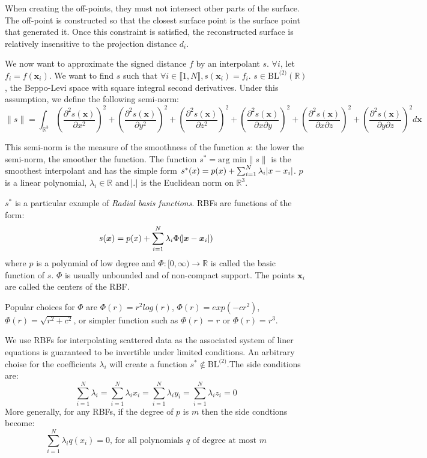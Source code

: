 \documentclass[12pt]{article}
\begin{document}
When creating the off-points, they must not intersect other parts of the surface. The off-point is constructed so that the closest surface point is the surface point that generated it. Once this constraint is satisfied, the reconstructed surface is relatively insensitive to the projection distance $d_i$.

We now want to approximate the signed distance $f$ by an interpolant $s$. $\forall i$, let $f_i = f(\boldsymbol{x}_i)$. We want to find $s$ such that $\forall i\in\llbracket 1,N\rrbracket, s(\boldsymbol{x}_i) = f_i$. $s \in \text{BL}^{\text{(2)}}(\mathbb{R})$, the Beppo-Levi space with square integral second derivatives. Under this assumption, we define the following semi-norm:
$$\|s\| = \int_{\mathbb{R}^3}\left(\frac{\partial^2s(\boldsymbol{x})}{\partial x^2}\right)^2 + \left(\frac{\partial^2s(\boldsymbol{x})}{\partial y^2}\right)^2 + \left(\frac{\partial^2s(\boldsymbol{x})}{\partial z^2}\right)^2 + \left(\frac{\partial^2s(\boldsymbol{x})}{\partial x\partial y}\right)^2 + \left(\frac{\partial^2s(\boldsymbol{x})}{\partial x\partial z}\right)^2 + \left(\frac{\partial^2s(\boldsymbol{x})}{\partial y\partial z}\right)^2 d\boldsymbol{x}$$

This semi-norm is the measure of the smoothness of the function $s$: the lower the semi-norm, the smoother the function. The function $s^* = \text{arg min} \|s\|$ is the smoothest interpolant and has the simple form $s^*(x) = p(x) + \sum_{i = 1}^{N}\lambda_i\abs{x - x_i}$. $p$ is a linear polynomial, $\lambda_i \in \mathbb{R}$ and $\abs{.}$ is the Euclidean norm on $\mathbb{R}^3$.

$s^*$ is a particular example of \emph{Radial basis functions}. RBFs are functions of the form:
$$s(\boldsymbol{x}) = p(x) + \sum_{i=1}^{N}\lambda_i\Phi(\abs{\boldsymbol{x} - \boldsymbol{x}_i})$$
where $p$ is a polynmial of low degree and $\Phi:[0,\infty) \to \mathbb{R}$ is called the basic function of $s$. $\Phi$ is usually unbounded and of non-compact support. The points $\boldsymbol{x}_i$ are called the centers of the RBF.

Popular choices for $\Phi$ are $\Phi(r) = r^2log(r)$, $\Phi(r) = exp(-cr^2)$, $\Phi(r) = \sqrt{r^2+c^2}$, or simpler function such as $\Phi(r) = r$ or $\Phi(r) = r^3$.

We use RBFs for interpolating scattered data as the associated system of liner equations is guaranteed to be invertible under limited conditions. An arbitrary choise for the coefficients $\lambda_i$ will create a function $s^* \notin \text{BL}^{\text{(2)}}$.The side conditions are:
$$\sum_{i = 1}^{N}\lambda_i =  \sum_{i = 1}^{N}\lambda_i x_i = \sum_{i = 1}^{N}\lambda_i y_i =\sum_{i = 1}^{N}\lambda_i z_i = 0$$
More generally, for any RBFs, if the degree of $p$ is $m$ then the side condtions become:
$$\sum_{i = 1}^{N}\lambda_i q(x_i) = 0\text{, for all polynomials }q\text{ of degree at most }m$$
\end{document}
